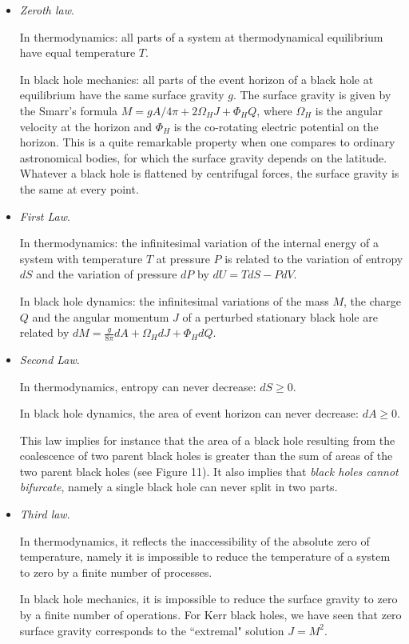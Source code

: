 \documentclass{lamuphys}
\begin{document}
\begin{itemize}
\item {\it Zeroth law}.

In thermodynamics: all parts of a system at thermodynamical equilibrium have
equal temperature $T$.

In black hole mechanics: all parts of the event horizon of a black hole at
equilibrium have the same surface gravity $g$. The
surface gravity is given by the Smarr's formula $M = gA/4\pi + 2
\Omega_HJ + \Phi_H Q$, where  $\Omega_H$ is the angular velocity at the
horizon and  $\Phi_H$ is the co-rotating electric potential on the horizon.
This is a quite remarkable property when one compares to ordinary astronomical
bodies, for which the surface gravity depends on the latitude. Whatever a black
hole is flattened by centrifugal forces, the surface gravity is the same at
every point.
\item {\it First Law}.

In thermodynamics: the infinitesimal variation of the internal energy of a
system with temperature $T$ at pressure $P$ is related to the 
variation of entropy $dS$ and the variation of pressure $dP$ by
$dU = T dS - PdV$.

In black hole dynamics: the infinitesimal variations of the mass $M$, the charge
$Q$ and the angular momentum $J$ of a perturbed stationary black hole are
related by $dM = \frac{g}{8\pi}dA + \Omega_H dJ +\Phi_H dQ$.   
 
\item {\it Second Law}.

In thermodynamics, entropy can never decrease: $dS \ge 0$.

In black hole dynamics, the area of event horizon can never decrease: $dA
\ge 0$.

This law implies for instance that the area of a black hole resulting from
the coalescence of two parent black holes is greater than the sum of areas of
the two parent black holes (see Figure 11). It also implies that {\it black holes
cannot bifurcate}, namely a single black hole can never split in two parts. 

\item {\it Third law}.

In thermodynamics, it reflects the inaccessibility of the absolute zero of
temperature, namely it is impossible to reduce the temperature of a system to
zero by a finite number of processes.
  
In black hole mechanics, it is impossible to reduce the surface
gravity to zero by a finite number of operations. For Kerr black
holes, we have seen that zero surface gravity corresponds to the
 ``extremal" solution $J=M^2$.
\end{itemize}
 
\end{document}
